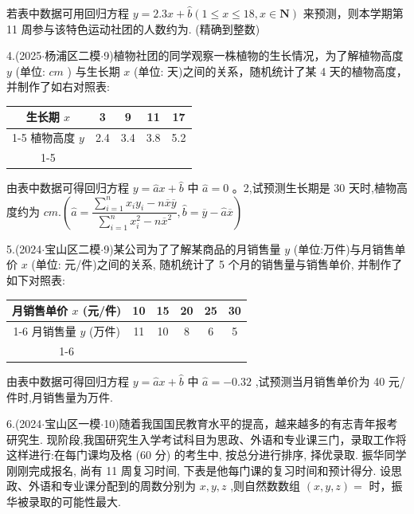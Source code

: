 若表中数据可用回归方程 $y = {2.3x} + \widehat{b}\left( {1 \leq  x \leq  {18},x \in  \mathbf{N}}\right)$ 来预测，则本学期第 11 周参与该特色运动社团的人数约为\blkda[2]{}. (精确到整数)

4.(2025$\cdot$杨浦区二模$\cdot$9)植物社团的同学观察一株植物的生长情况，为了解植物高度 $y$ (单位: ${{cm}}$ ) 与生长期 $x$ (单位: 天)之间的关系，随机统计了某 4 天的植物高度，并制作了如右对照表:

\begin{center}

\begin{tabular}{|c|c|c|c|c|}
\hline
生长期 $x$ & 3 & 9 & 11 & 17 \\
\cline{1-5}
植物高度 $y$ & 2.4 & 3.4 & 3.8 & 5.2 \\
\cline{1-5}
\hline
\end{tabular}
\end{center}

由表中数据可得回归方程 $y = \widehat{a}x + \widehat{b}$ 中 $\widehat{a} = 0$ 。2,试预测生长期是 30 天时,植物高度约为\blkda[2]{} ${{cm}}.\left( {\widehat{a} = \dfrac{\mathop{\sum }\limits_{{i = 1}}^{n}{x}_{i}{y}_{i} - n\overline{x}\overline{y}}{\mathop{\sum }\limits_{{i = 1}}^{n}{x}_{i}^{2} - n{\overline{x}}^{2}},\widehat{b} = \overline{y} - \widehat{a}\overline{x}}\right)$

5.(2024$\cdot$宝山区二模$\cdot$9)某公司为了了解某商品的月销售量 $y$ (单位:万件)与月销售单价 $x$ (单位: 元/件)之间的关系, 随机统计了 5 个月的销售量与销售单价, 并制作了如下对照表:

\begin{center}

\begin{tabular}{|c|c|c|c|c|c|}
\hline
月销售单价 $x$ (元/件) & 10 & 15 & 20 & 25 & 30 \\
\cline{1-6}
月销售量 $y$ (万件) & 11 & 10 & 8 & 6 & 5 \\
\cline{1-6}
\hline
\end{tabular}
\end{center}

由表中数据可得回归方程 $y = \widehat{a}x + \widehat{b}$ 中 $\widehat{a} =  - {0.32}$ ,试预测当月销售单价为 40 元/件时,月销售量为\blkda[2]{}万件.

6.(2024$\cdot$宝山区一模$\cdot$10)随着我国国民教育水平的提高，越来越多的有志青年报考研究生. 现阶段,我国研究生入学考试科目为思政、外语和专业课三门，录取工作将这样进行:在每门课均及格 (60 分) 的考生中, 按总分进行排序, 择优录取. 振华同学刚刚完成报名, 尚有 11 周复习时间, 下表是他每门课的复习时间和预计得分. 设思政、外语和专业课分配到的周数分别为 $x,y,z$ ,则自然数数组 $\left( {x,y,z}\right)  =$ \blkda[2]{}时，振华被录取的可能性最大.

